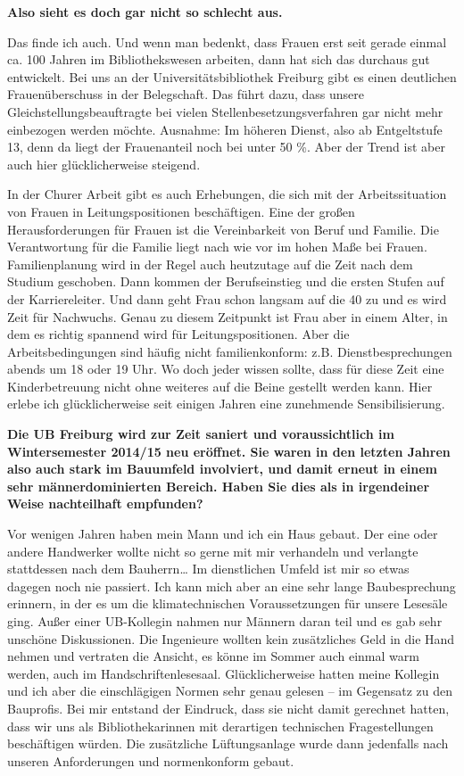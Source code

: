 \documentclass[a4paper,
fontsize=11pt,
oneside,
numbers=noperiodatend,
parskip=half-,
bibliography=totoc,
final
]{scrartcl}
\begin{document}
\textbf{Also sieht es doch gar nicht so schlecht aus.}

Das finde ich auch. Und wenn man bedenkt, dass Frauen erst seit gerade
einmal ca. 100 Jahren im Bibliothekswesen arbeiten, dann hat sich das
durchaus gut entwickelt. Bei uns an der Universitätsbibliothek Freiburg
gibt es einen deutlichen Frauenüberschuss in der Belegschaft. Das führt
dazu, dass unsere Gleichstellungsbeauftragte bei vielen
Stellenbesetzungsverfahren gar nicht mehr einbezogen werden möchte.
Ausnahme: Im höheren Dienst, also ab Entgeltstufe 13, denn da liegt der
Frauenanteil noch bei unter 50 \%. Aber der Trend ist aber auch hier
glücklicherweise steigend.

In der Churer Arbeit gibt es auch Erhebungen, die sich mit der
Arbeitssituation von Frauen in Leitungspositionen beschäftigen. Eine der
großen Herausforderungen für Frauen ist die Vereinbarkeit von Beruf und
Familie. Die Verantwortung für die Familie liegt nach wie vor im hohen
Maße bei Frauen. Familienplanung wird in der Regel auch heutzutage auf
die Zeit nach dem Studium geschoben. Dann kommen der Berufseinstieg und
die ersten Stufen auf der Karriereleiter. Und dann geht Frau schon
langsam auf die 40 zu und es wird Zeit für Nachwuchs. Genau zu diesem
Zeitpunkt ist Frau aber in einem Alter, in dem es richtig spannend wird
für Leitungspositionen. Aber die Arbeitsbedingungen sind häufig nicht
familienkonform: z.B. Dienstbesprechungen abends um 18 oder 19 Uhr. Wo
doch jeder wissen sollte, dass für diese Zeit eine Kinderbetreuung nicht
ohne weiteres auf die Beine gestellt werden kann. Hier erlebe ich
glücklicherweise seit einigen Jahren eine zunehmende Sensibilisierung.

\textbf{Die UB Freiburg wird zur Zeit saniert und voraussichtlich im
Wintersemester 2014/15 neu eröffnet. Sie waren in den letzten Jahren
also auch stark im Bauumfeld involviert, und damit erneut in einem sehr
männerdominierten Bereich. Haben Sie dies als in irgendeiner Weise
nachteilhaft empfunden?}

Vor wenigen Jahren haben mein Mann und ich ein Haus gebaut. Der eine
oder andere Handwerker wollte nicht so gerne mit mir verhandeln und
verlangte stattdessen nach dem Bauherrn\ldots{} Im dienstlichen Umfeld
ist mir so etwas dagegen noch nie passiert. Ich kann mich aber an eine
sehr lange Baubesprechung erinnern, in der es um die klimatechnischen
Voraussetzungen für unsere Lesesäle ging. Außer einer UB-Kollegin nahmen
nur Männern daran teil und es gab sehr unschöne Diskussionen. Die
Ingenieure wollten kein zusätzliches Geld in die Hand nehmen und
vertraten die Ansicht, es könne im Sommer auch einmal warm werden, auch
im Handschriftenlesesaal. Glücklicherweise hatten meine Kollegin und ich
aber die einschlägigen Normen sehr genau gelesen -- im Gegensatz zu den
Bauprofis. Bei mir entstand der Eindruck, dass sie nicht damit gerechnet
hatten, dass wir uns als Bibliothekarinnen mit derartigen technischen
Fragestellungen beschäftigen würden. Die zusätzliche Lüftungsanlage
wurde dann jedenfalls nach unseren Anforderungen und normenkonform
gebaut.
\end{document}
